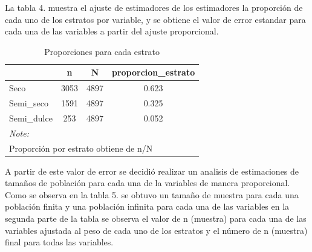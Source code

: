 \documentclass[
]{article}
\begin{document}
La tabla 4. muestra el ajuste de estimadores de los estimadores la
proporción de cada uno de los estratos por variable, y se obtiene el
valor de error estandar para cada una de las variables a partir del
ajuste proporcional.

\begin{table}[!h]

\caption{\label{tab:gráfica prueba_def med ponderada2}Proporciones para cada estrato}
\centering
\fontsize{8}{10}\selectfont
\begin{tabular}[t]{l|c|c|c}
\hline
  & n & N & proporcion\_estrato\\
\hline
\rowcolor{gray!6}  Seco & 3053 & 4897 & 0.623\\
\hline
Semi\_seco & 1591 & 4897 & 0.325\\
\hline
\rowcolor{gray!6}  Semi\_dulce & 253 & 4897 & 0.052\\
\hline
\multicolumn{4}{l}{\textit{Note: }}\\
\multicolumn{4}{l}{Proporción por estrato obtiene de n/N}\\
\end{tabular}
\end{table}

A partir de este valor de error se decidió realizar un analisis de
estimaciones de tamaños de población para cada una de la variables de
manera proporcional. Como se observa en la tabla 5. se obtuvo un tamaño
de muestra para cada una población finita y una población infinita para
cada una de las variables en la segunda parte de la tabla se observa el
valor de n (muestra) para cada una de las variables ajustada al peso de
cada uno de los estratos y el número de n (muestra) final para todas las
variables.
\end{document}
